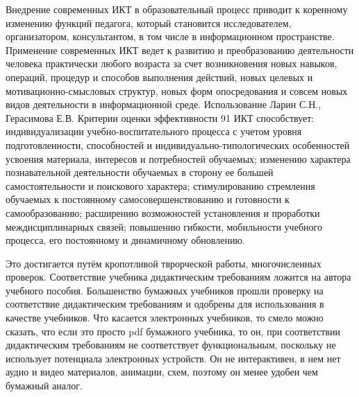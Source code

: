 Внедрение современных ИКТ в образовательный процесс приводит к коренному изменению функций педагога, который становится исследователем, организатором, консультантом, в том числе в информационном пространстве.
Применение современных ИКТ ведет к развитию и преобразованию деятельности человека практически любого возраста за счет возникновения новых
навыков, операций, процедур и способов выполнения действий, новых целевых и мотивационно-смысловых структур, новых форм опосредования и
совсем новых видов деятельности в информационной среде. Использование Ларин С.Н., Герасимова Е.В. Критерии оценки эффективности
91
ИКТ способствует: индивидуализации учебно-воспитательного процесса с
учетом уровня подготовленности, способностей и индивидуально-типологических особенностей усвоения материала, интересов и потребностей обучаемых; изменению характера познавательной деятельности обучаемых в
сторону ее большей самостоятельности и поискового характера; стимулированию стремления обучаемых к постоянному самосовершенствованию и
готовности к самообразованию; расширению возможностей установления и
проработки междисциплинарных связей; повышению гибкости, мобильности учебного процесса, его постоянному и динамичному обновлению.

Это достигается путём кропотливой тврорческой работы, многочисленных проверок. Соответствие учебника дидактическим требованиям ложится на автора учебного пособия. Большенство бумажных учебников прошли проверку на соответствие дидактическим требованиям и одобрены для использования в качестве учебников. Что касается электронных учебников, то смело можно сказать, что если это просто pdf бумажного учебника, то он, при соответствии дидактическим требованиям не соответствует функциональным, поскольку не использует потенциала электронных устройств. Он не интерактивен, в нем нет аудио и видео материалов, анимации, схем, поэтому он менее удобен чем бумажный аналог.